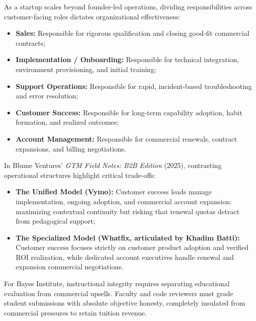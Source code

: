 As a startup scales beyond founder-led operations, dividing responsibilities across customer-facing roles dictates organizational effectiveness:
\begin{itemize}
\item \textbf{Sales:} Responsible for rigorous qualification and closing good-fit commercial contracts;
\item \textbf{Implementation / Onboarding:} Responsible for technical integration, environment provisioning, and initial training;
\item \textbf{Support Operations:} Responsible for rapid, incident-based troubleshooting and error resolution;
\item \textbf{Customer Success:} Responsible for long-term capability adoption, habit formation, and realized outcomes;
\item \textbf{Account Management:} Responsible for commercial renewals, contract expansions, and billing negotiations.
\end{itemize}
In Blume Ventures' \textit{GTM Field Notes: B2B Edition} (2025), contrasting operational structures highlight critical trade-offs:
\begin{itemize}
\item \textbf{The Unified Model (Vymo):} Customer success leads manage implementation, ongoing adoption, and commercial account expansion: maximizing contextual continuity but risking that renewal quotas detract from pedagogical support;
\item \textbf{The Specialized Model (Whatfix, articulated by Khadim Batti):} Customer success focuses strictly on customer product adoption and verified ROI realization, while dedicated account executives handle renewal and expansion commercial negotiations.
\end{itemize}
For Bayes Institute, instructional integrity requires separating educational evaluation from commercial upsells. Faculty and code reviewers must grade student submissions with absolute objective honesty, completely insulated from commercial pressures to retain tuition revenue.
